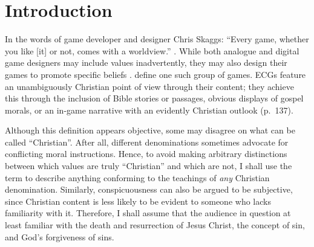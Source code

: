 \chapter{Introduction}



In the words of game developer and designer Chris Skaggs: ``Every game, whether you like [it] or not, comes with a worldview.'' \parencite[136]{schut_making_2013}. While both analogue and digital game designers may include values inadvertently, they may also design their games to promote specific beliefs \parencite{bogost_persuasive_2007, flanagan_values_2014}. \textcite{schut_making_2013} define one such group of games. \acp{ECG} feature an unambiguously Christian point of view through their content; they achieve this through the inclusion of Bible stories or passages, obvious displays of gospel morals, or an in-game narrative with an evidently Christian outlook (p.\ 137).

Although this definition appears objective, some may disagree on what can be called ``Christian''. After all, different denominations sometimes advocate for conflicting moral instructions. Hence, to avoid making arbitrary distinctions between which values are truly ``Christian'' and which are not, I shall use the term to describe anything conforming to the teachings of \textit{any} Christian denomination. Similarly, conspicuousness can also be argued to be subjective, since Christian content is less likely to be evident to someone who lacks familiarity with it. Therefore, I shall assume that the audience in question at least familiar with the death and resurrection of Jesus Christ, the concept of sin, and God's forgiveness of sins.


